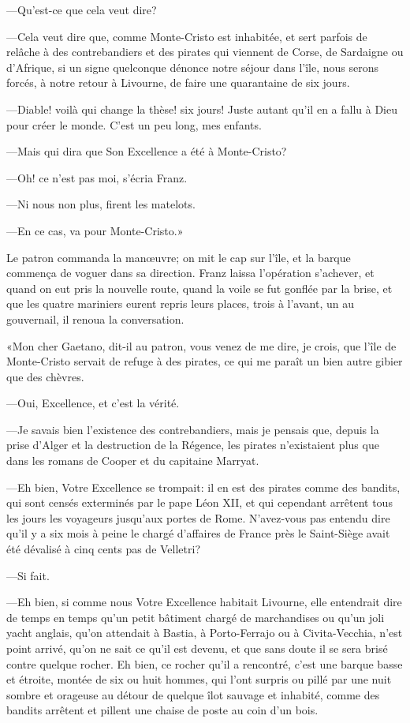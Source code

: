 —Qu'est-ce que cela veut dire?

—Cela veut dire que, comme Monte-Cristo est inhabitée, et sert parfois de relâche à des contrebandiers et des pirates qui viennent de Corse, de Sardaigne ou d'Afrique, si un signe quelconque dénonce notre séjour dans l'île, nous serons forcés, à notre retour à Livourne, de faire une quarantaine de six jours.

—Diable! voilà qui change la thèse! six jours! Juste autant qu'il en a fallu à Dieu pour créer le monde. C'est un peu long, mes enfants.

—Mais qui dira que Son Excellence a été à Monte-Cristo?

—Oh! ce n'est pas moi, s'écria Franz.

—Ni nous non plus, firent les matelots.

—En ce cas, va pour Monte-Cristo.»

Le patron commanda la manœuvre; on mit le cap sur l'île, et la barque commença de voguer dans sa direction. Franz laissa l'opération s'achever, et quand on eut pris la nouvelle route, quand la voile se fut gonflée par la brise, et que les quatre mariniers eurent repris leurs places, trois à l'avant, un au gouvernail, il renoua la conversation.

«Mon cher Gaetano, dit-il au patron, vous venez de me dire, je crois, que l'île de Monte-Cristo servait de refuge à des pirates, ce qui me paraît un bien autre gibier que des chèvres.

—Oui, Excellence, et c'est la vérité.

—Je savais bien l'existence des contrebandiers, mais je pensais que, depuis la prise d'Alger et la destruction de la Régence, les pirates n'existaient plus que dans les romans de Cooper et du capitaine Marryat.

—Eh bien, Votre Excellence se trompait: il en est des pirates comme des bandits, qui sont censés exterminés par le pape Léon XII, et qui cependant arrêtent tous les jours les voyageurs jusqu'aux portes de Rome. N'avez-vous pas entendu dire qu'il y a six mois à peine le chargé d'affaires de France près le Saint-Siège avait été dévalisé à cinq cents pas de Velletri?

—Si fait.

—Eh bien, si comme nous Votre Excellence habitait Livourne, elle entendrait dire de temps en temps qu'un petit bâtiment chargé de marchandises ou qu'un joli yacht anglais, qu'on attendait à Bastia, à Porto-Ferrajo ou à Civita-Vecchia, n'est point arrivé, qu'on ne sait ce qu'il est devenu, et que sans doute il se sera brisé contre quelque rocher. Eh bien, ce rocher qu'il a rencontré, c'est une barque basse et étroite, montée de six ou huit hommes, qui l'ont surpris ou pillé par une nuit sombre et orageuse au détour de quelque îlot sauvage et inhabité, comme des bandits arrêtent et pillent une chaise de poste au coin d'un bois.


